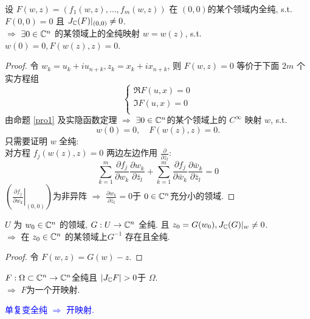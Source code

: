 \begin{theorem}[隐函数定理]
 设 $ F(w,z)=(f_1(w,z),\dots,f_m(w,z)) $ 在 $ (0,0) $的某个领域内全纯, s.t. $ F(0,0)=0 $ 且 $ J_{{\mathbb C}}(F)|_{(0,0)} \neq 0 $.\\
 $ \Rightarrow  $ $ \exists 0 \in {\mathbb C}^n $ 的某领域上的全纯映射 $ w=w(z) $, s.t. $ w(0)=0 , F(w(z),z)=0$.
\end{theorem}
\begin{proof}
  令 $ w_k=u_k+iu_{n+k},z_k=x_k+i x_{n+k} $, 则 $ F(w,z)=0 $ 等价于下面 $ 2m $ 个实方程组
  $$\left\{  \begin{aligned}
    \Re F(u,x)=0 \\
   \Im F(u,x)=0 \\
  \end{aligned} \right. $$
  由命题 \ref{pro1} 及实隐函数定理 $ \Rightarrow  $ 
  $ \exists 0 \in {\mathbb C}^n $的某个领域上的 $ C^{\infty } $ 映射 $ w $, s.t. 
  $$ w(0)=0, \quad F(w(z),z)=0. $$
  只需要证明 $ w $ 全纯:\\
  对方程 $ f_j(w(z),z)=0 $ 两边左边作用 $ \frac{\partial }{\partial \bar{z}_l}  $:
  $$ \sum_{k=1}^{m} \frac{\partial f_j}{\partial w_k} \frac{\partial w_k}{\partial \bar{z}_l} +\sum_{k=1}^{m} \frac{\partial f_j}{\partial \bar w_k} \frac{\partial \bar w_k}{\partial \bar{z}_l}=0$$
  $ \left(\left. \frac{\partial f_j}{\partial w_k}\right|_{(0,0)} \right)$为非异阵 $ \Rightarrow  $ $  \frac{\partial w_k}{\partial \bar{z}_l}=0 $于 $ 0 \in {\mathbb C}^n $充分小的领域.
\end{proof}

\begin{corollary}[逆映射定理]
 $ U $ 为 $ w_0 \in {\mathbb C}^n $ 的领域, $ G: U \to {\mathbb C}^n $ 全纯. 且 $ z_0 =G(w_0), J_{{\mathbb C}}(G)|_w \neq 0$. \\
 $ \Rightarrow  $ 在 $z_0 \in {\mathbb C}^n$ 的某领域上$G^{-1}$ 存在且全纯.
\end{corollary}
\begin{proof}
  令 $ F(w,z)=G(w)-z $.
\end{proof}

\begin{corollary}
$ F:\Omega \subset {\mathbb C}^n \to {\mathbb C}^n  $全纯且 $ |J_{\cc}F|>0 $于 $ \Omega  $.\\
$ \Rightarrow  $ $ F $为一个开映射.
\end{corollary}
\begin{remark}
  \textcolor{blue}{单复变全纯 $ \Rightarrow  $ 开映射.}
\end{remark}

